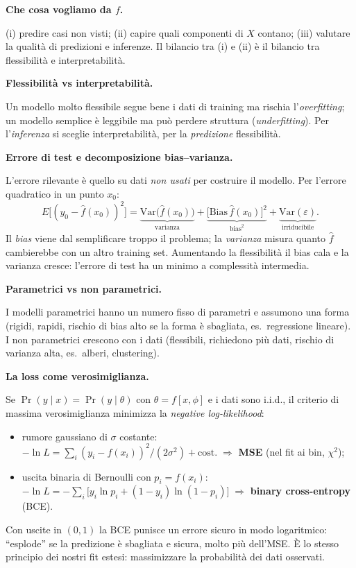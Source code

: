 \documentclass[11pt,a4paper]{article}
\newcommand{\dom}[1]{\par\smallskip\noindent\textbf{#1}\par\nopagebreak}
\begin{document}
\dom{Che cosa vogliamo da $f$.} (i) predire casi non visti; (ii) capire quali componenti di $X$ contano; (iii) valutare la qualit\`a di predizioni e inferenze. Il bilancio tra (i) e (ii) \`e il bilancio tra flessibilit\`a e interpretabilit\`a.

\dom{Flessibilit\`a vs interpretabilit\`a.} Un modello molto flessibile segue bene i dati di training ma rischia l'\emph{overfitting}; un modello semplice \`e leggibile ma pu\`o perdere struttura (\emph{underfitting}). Per l'\emph{inferenza} si sceglie interpretabilit\`a, per la \emph{predizione} flessibilit\`a.

\dom{Errore di test e decomposizione bias--varianza.} L'errore rilevante \`e quello su dati \emph{non usati} per costruire il modello. Per l'errore quadratico in un punto $x_0$:
\[
E\big[(y_0-\hat f(x_0))^2\big]=\underbrace{\mathrm{Var}\big(\hat f(x_0)\big)}_{\text{varianza}}+\underbrace{\big[\mathrm{Bias}\,\hat f(x_0)\big]^2}_{\text{bias}^2}+\underbrace{\mathrm{Var}(\varepsilon)}_{\text{irriducibile}}.
\]
Il \emph{bias} viene dal semplificare troppo il problema; la \emph{varianza} misura quanto $\hat f$ cambierebbe con un altro training set. Aumentando la flessibilit\`a il bias cala e la varianza cresce: l'errore di test ha un minimo a complessit\`a intermedia.

\dom{Parametrici vs non parametrici.} I modelli parametrici hanno un numero fisso di parametri e assumono una forma (rigidi, rapidi, rischio di bias alto se la forma \`e sbagliata, es.\ regressione lineare). I non parametrici crescono con i dati (flessibili, richiedono pi\`u dati, rischio di varianza alta, es.\ alberi, clustering).

\dom{La loss come verosimiglianza.} Se $\Pr(y\mid x)=\Pr(y\mid\theta)$ con $\theta=f[x,\phi]$ e i dati sono i.i.d., il criterio di massima verosimiglianza minimizza la \emph{negative log-likelihood}:
\begin{itemize}
\item rumore gaussiano di $\sigma$ costante: $-\ln L=\sum_i (y_i-f(x_i))^2/(2\sigma^2)+\text{cost.}\;\Rightarrow$ \textbf{MSE} (nel fit ai bin, $\chi^2$);
\item uscita binaria di Bernoulli con $p_i=f(x_i)$: $-\ln L=-\sum_i\big[y_i\ln p_i+(1-y_i)\ln(1-p_i)\big]\;\Rightarrow$ \textbf{binary cross-entropy} (BCE).
\end{itemize}
Con uscite in $(0,1)$ la BCE punisce un errore sicuro in modo logaritmico: ``esplode'' se la predizione \`e sbagliata e sicura, molto pi\`u dell'MSE. \`E lo stesso principio dei nostri fit estesi: massimizzare la probabilit\`a dei dati osservati.
\end{document}
